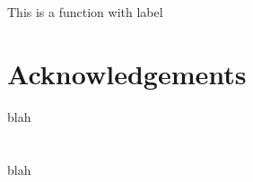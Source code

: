 \documentclass[10pt]{article}
\begin{document}
This is a function with label \label{alg:func}
~\bigskip


\section*{Acknowledgements}

blah





\clearpage



\appendix
\section{}
blah
\end{document}
